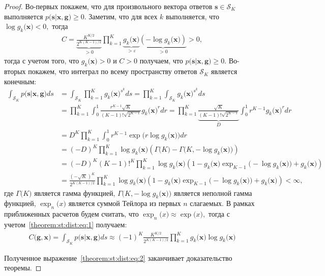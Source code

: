 \begin{proof}
	Во-первых покажем, что для произвольного вектора ответов $\mathbf{s} \in \mathcal{S}_K$ выполняется $p\bigr(\mathbf{s}|\mathbf{x}, \mathbf{g}\bigr) \geq 0$. Заметим, что для всех $k$ выполняется, что $\log g_k\bigr(\mathbf{x}\bigr) < 0,$ тогда
\[
\begin{aligned}
	C=\underbrace{\frac{K^{K/2}}{2^{K(K-1)/2}}}_{>0}\prod_{k=1}^{K}\underbrace{g_k\bigr(\mathbf{x}\bigr)}_{>\varepsilon}\underbrace{\left(-\log g_k\bigr(\mathbf{x}\bigr)\right)}_{>0} > 0,
\end{aligned}
\]
тогда с учетом того, что $g_k\bigr(\mathbf{x}\bigr) >0$ и $C>0$ получаем, что $p\bigr(\mathbf{s}|\mathbf{x}, \mathbf{g}\bigr) \geq 0$.
	Во-вторых покажем, что интеграл по всему пространству ответов $\mathcal{S}_K$ является конечным:
	\[
	\label{theorem:st:dist:eq:1}
	\begin{aligned}
		\int_{\mathcal{S}_K}p\bigr(\mathbf{s}|\mathbf{x}, \mathbf{g}\bigr)ds &= \int_{\mathcal{S}_K}\prod_{k=1}^{K}g_k\bigr(\mathbf{x}\bigr)^{s^k}ds = \prod_{k=1}^{K}\int_{\mathcal{S}_K}g_k\bigr(\mathbf{x}\bigr)^{s^k}ds\\ 
		& = \prod_{k=1}^{K}\int_{0}^{1}\frac{r^{K-1}\sqrt{K}}{\left(K-1\right)!\sqrt{2^{K-1}}}g_k\bigr(\mathbf{x}\bigr)^{r}dr = \prod_{k=1}^{K}\underbrace{\frac{\sqrt{K}}{\left(K-1\right)!\sqrt{2^{K-1}}}}_{D}\int_{0}^{1}r^{K-1}g_k\bigr(\mathbf{x}\bigr)^{r}dr \\
		& = D^K\prod_{k=1}^{K} \int_{0}^{1}r^{K-1}\exp\bigr(r\log g_k\bigr(\mathbf{x}\bigr)\bigr)dr \\
		& = \left(-D\right)^K\prod_{k=1}^{K}\log g_k\bigr(\mathbf{x}\bigr)\left(\Gamma\bigr(K\bigr) - \Gamma\bigr(K, -\log g_k\bigr(\mathbf{x}\bigr)\bigr)\right) \\
		& = \left(-D\right)^K\left(K-1\right)!^K\prod_{k=1}^{K}\log g_k\bigr(\mathbf{x}\bigr)\left(1 -g_k\bigr(\mathbf{x}\bigr) \exp_{K-1}\bigr(-\log g_k\bigr(\mathbf{x}\bigr)\bigr)+g_k\bigr(\mathbf{x}\bigr)\right) \\
		& = \frac{\left(-\sqrt{K}\right)^K}{2^{K(K-1)/2}}\prod_{k=1}^{K}\log g_k\bigr(\mathbf{x}\bigr)\left(1 -g_k\bigr(\mathbf{x}\bigr) \exp_{K-1}\bigr(-\log g_k\bigr(\mathbf{x}\bigr)\bigr)+g_k\bigr(\mathbf{x}\bigr)\right) < \infty,
	\end{aligned}
	\]
где $\Gamma\bigr(K\bigr)$ является гамма функцией, $\Gamma\bigr(K, -\log g_k\bigr(\mathbf{x}\bigr)\bigr)$ является неполной гамма функцией, $\exp_{n}\bigr(x\bigr)$ является суммой Тейлора из первых $n$ слагаемых. В рамках приближенных расчетов будем считать, что $\exp_{n}\bigr(x\bigr)\approx\exp\bigr(x\bigr),$ тогда с учетом~\eqref{theorem:st:dist:eq:1} получаем:
	\[
	\label{theorem:st:dist:eq:2}
	\begin{aligned}
		C\bigr(\mathbf{g}, \mathbf{x}\bigr) = \int_{\mathcal{S}_K}p\bigr(\mathbf{s}|\mathbf{x}, \mathbf{g}\bigr)ds \approx \left(-1\right)^{K}\frac{K^{K/2}}{2^{K(K-1)/2}}\prod_{k=1}^{K}g_k\bigr(\mathbf{x}\bigr)\log g_k\bigr(\mathbf{x}\bigr)
	\end{aligned}
	\]
	
Полученное выражение~\eqref{theorem:st:dist:eq:2} заканчивает доказательство теоремы.
\end{proof}

